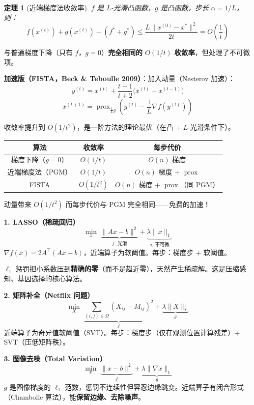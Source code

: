 \documentclass[12pt, a4paper]{ctexart}
\newtheorem{theorem}{定理}[section]
\begin{document}
\begin{blackboard}[收敛率分析]

\begin{theorem}[近端梯度法收敛率]
$f$ 是 $L$-光滑凸函数，$g$ 是凸函数，步长 $\alpha = 1/L$，则：
\[
f(x^{(t)}) + g(x^{(t)}) - (f^* + g^*) \leq \frac{L\|x^{(0)} - x^*\|^2}{2t} = O\!\left(\frac{1}{t}\right)
\]
\end{theorem}

与普通梯度下降（只有 $f$，$g=0$）\textbf{完全相同的 $O(1/t)$ 收敛率}，但处理了不可微项。

\textbf{加速版（FISTA，Beck \& Teboulle 2009）}：加入动量（Nesterov 加速）：
\[
y^{(t)} = x^{(t)} + \frac{t-1}{t+2}\bigl(x^{(t)} - x^{(t-1)}\bigr)
\]
\[
x^{(t+1)} = \operatorname{prox}_{\frac{1}{L}g}\!\left(y^{(t)} - \frac{1}{L}\nabla f(y^{(t)})\right)
\]

收敛率提升到 $O(1/t^2)$，是一阶方法的理论最优（在凸 + $L$-光滑条件下）。

\begin{center}
\begin{tabular}{c|c|c}
算法 & 收敛率 & 每步代价 \\
\hline
梯度下降（$g=0$） & $O(1/t)$ & $O(n)$ 梯度 \\
近端梯度法（PGM） & $O(1/t)$ & $O(n)$ 梯度 + $\operatorname{prox}$ \\
FISTA & $O(1/t^2)$ & $O(n)$ 梯度 + $\operatorname{prox}$（同 PGM） \\
\end{tabular}
\end{center}

动量带来 $O(1/t^2)$ 而每步代价与 PGM 完全相同——免费的加速！

\end{blackboard}

\begin{blackboard}[三个具体应用]

\textbf{1. LASSO（稀疏回归）}
\[
\min_x \; \underbrace{\|Ax - b\|^2}_{f,\ \text{光滑}} + \underbrace{\lambda\|x\|_1}_{g,\ \text{不可微}}
\]
$\nabla f(x) = 2A^\top(Ax - b)$，近端算子为软阈值。每步：梯度步 + 软阈值。

$\ell_1$ 惩罚把小系数压到\textbf{精确的零}（而不是趋近零），天然产生稀疏解。这是压缩感知、基因选择的核心算法。

\vspace{0.5em}
\textbf{2. 矩阵补全（Netflix 问题）}
\[
\min_X \; \underbrace{\sum_{(i,j)\in\Omega}(X_{ij} - M_{ij})^2}_{f} + \underbrace{\lambda\|X\|_*}_{g}
\]
近端算子为奇异值软阈值（SVT）。每步：梯度步（仅在观测位置计算残差）+ SVT（压低矩阵秩）。

\vspace{0.5em}
\textbf{3. 图像去噪（Total Variation）}
\[
\min_x \; \underbrace{\|x - b\|^2}_{f} + \underbrace{\lambda\|\nabla x\|_1}_{g}
\]
$g$ 是图像梯度的 $\ell_1$ 范数，惩罚不连续性但容忍边缘跳变。近端算子有闭合形式（Chambolle 算法），能\textbf{保留边缘、去除噪声}。

\end{blackboard}
\end{document}
